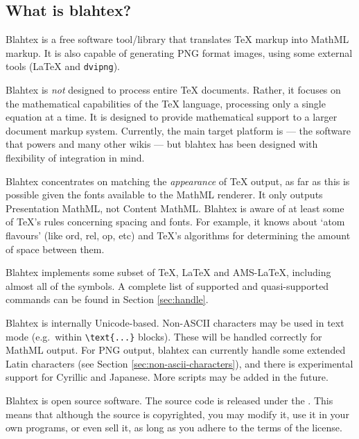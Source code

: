 \documentclass{article}
\newcommand{\texcommand}[1]{\textbackslash{}#1}
\begin{document}
\subsection{What is blahtex?}

Blahtex is a free software tool/library that translates \TeX{} markup into MathML markup. It is also capable of generating PNG format images, using some external tools (\LaTeX{} and \texttt{dvipng}).

Blahtex is \emph{not} designed to process entire \TeX{} documents. Rather, it focuses on the mathematical capabilities of the \TeX{} language, processing only a single equation at a time. It is designed to provide mathematical support to a larger document markup system. Currently, the main target platform is  --- the software that powers  and many other wikis --- but blahtex has been designed with flexibility of integration in mind.

Blahtex concentrates on matching the \emph{appearance} of \TeX{} output, as far as this is possible given the fonts available to the MathML renderer. It only outputs Presentation MathML, not Content MathML. Blahtex is aware of at least some of \TeX{}'s rules concerning spacing and fonts. For example, it knows about `atom flavours' (like ord, rel, op, etc) and \TeX{}'s algorithms for determining the amount of space between them.

Blahtex implements some subset of \TeX{}, \LaTeX{} and AMS-\LaTeX{}, including almost all of the symbols. A complete list of supported and quasi-supported commands can be found in Section \ref{sec:handle}.

Blahtex is internally Unicode-based. Non-ASCII characters may be used in text mode (e.g.~within \texttt{\texcommand{text}\{...\}} blocks). These will be handled correctly for MathML output. For PNG output, blahtex can currently handle some extended Latin characters (see Section \ref{sec:non-ascii-characters}), and there is experimental support for Cyrillic and Japanese. More scripts may be added in the future.

Blahtex is open source software. The source code is released under the . This means that although the source is copyrighted, you may modify it, use it in your own programs, or even sell it, as long as you adhere to the terms of the license.
\end{document}
